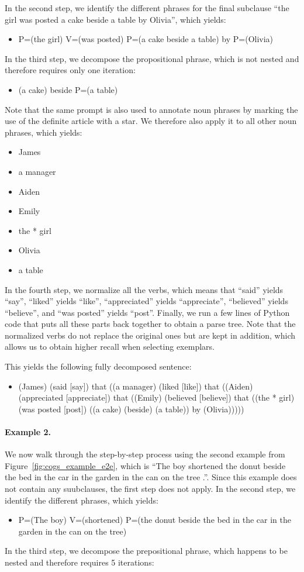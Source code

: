 \documentclass{article} \usepackage{iclr2022_conference,times}
\newcommand{\example}[1]{\begin{itemize} #1 \end{itemize}}
\newcommand{\ex}{\item}
\begin{document}
In the second step, we identify the different phrases for the final subclause ``the girl was posted a cake beside a table by Olivia'', which yields:

\example{
\ex P=(the girl) V=(was posted) P=(a cake beside a table) by P=(Olivia)
}

In the third step, we decompose the propositional phrase, which is not nested and therefore requires only one iteration:

\example{
\ex (a cake) beside P=(a table)
}

Note that the same prompt is also used to annotate noun phrases by marking the use of the definite article with a star. We therefore also apply it to all other noun phrases, which yields:

\example{
\ex James
\ex a manager
\ex Aiden
\ex Emily
\ex the * girl
\ex Olivia
\ex a table
}

In the fourth step, we normalize all the verbs, which means that ``said'' yields ``say'', ``liked'' yields ``like'', ``appreciated'' yields ``appreciate'', ``believed'' yields ``believe'', and ``was posted'' yields ``post''. Finally, we run a few lines of Python code that puts all these parts back together to obtain a parse tree. Note that the normalized verbs do not replace the original ones but are kept in addition, which allows us to obtain higher recall when selecting exemplars.

This yields the following fully decomposed sentence: 

\example{\ex (James) (said [say]) that ((a manager) (liked [like]) that ((Aiden) (appreciated [appreciate]) that ((Emily) (believed [believe]) that ((the * girl) (was posted [post]) ((a cake) (beside) (a table)) by (Olivia)))))}

\paragraph{Example 2.}
We now walk through the step-by-step process using the second example from Figure~\ref{fig:cogs_example_e2e}, which is ``The boy shortened the donut beside the bed in the car in the garden in the can on the tree .''. Since this example does not contain any suubclauses, the first step does not apply. In the second step, we identify the different phrases, which yields:

\example{
\ex P=(The boy) V=(shortened) P=(the donut beside the bed in the car in the garden in the can on the tree)
}

In the third step, we decompose the prepositional phrase, which happens to be nested and therefore requires 5 iterations:
\end{document}
